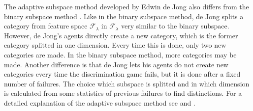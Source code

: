The adaptive subspace method developed by Edwin de Jong also differs from the binary subspace method \citep{dejongvogt:1998,dejong:2000}. Like in the binary subspace method, de Jong splits a category from feature space ${\mathcal F}_\lambda$ in ${\mathcal F}_{\lambda}$ very similar to the binary subspace. However, de Jong's agents directly create a new category, which is the former category splitted in one dimension. Every time this is done, only two new categories are made. In the binary subspace method, more categories may be made. Another difference is that de Jong lets his agents do not create new categories every time the discrimination game fails, but it is done after a fixed number of failures. The choice which subspace is splitted and in which dimension is calculated from some statistics of previous failures to find distinctions. For a detailed explanation of the adaptive subspace method see \citealt{dejongvogt:1998} and \citealt{dejong:2000}.


